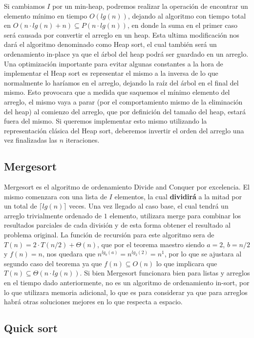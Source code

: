 Si cambiamos $I$ por un min-heap, podremos realizar la operaci\'on de encontrar un elemento m\'inimo en tiempo $O(lg(n))$, dejando al algoritmo con tiempo total en $O(n\cdot lg(n) + n) \subseteq P(n\cdot lg(n))$, en donde la suma en el primer caso ser\'a causada por convertir el arreglo en un heap. Esta ultima modificaci\'on nos dar\'a el algoritmo denominado como Heap sort, el cual tambi\'en ser\'a un ordenamiento in-place ya que el \'arbol del heap podr\'a ser guardado en un arreglo. Una optimizaci\'on importante para evitar algunas constantes a la hora de implementar el Heap sort es representar el mismo a la inversa de lo que normalmente lo har\'iamos en el arreglo, dejando la ra\'iz del \'arbol en el final del mismo. Esto provocara que a medida que saquemos el m\'inimo elemento del arreglo, el mismo vaya a parar (por el comportamiento mismo de la eliminaci\'on del heap) al comienzo del arreglo, que por definici\'on del tama\~no del heap, estar\'a fuera del mismo. Si queremos implementar esto mismo
utilizando la representaci\'on cl\'asica del Heap sort, deberemos invertir el orden del arreglo una vez finalizadas las $n$ iteraciones.

\subsection{Mergesort}

Mergesort es el algoritmo de ordenamiento Divide and Conquer por excelencia. El mismo comenzara con una lista de $I$ elementos, la cual \textbf{dividir\'a} a la mitad por un total de $\lceil lg(n) \rceil$ veces. Una vez llegado al caso base, el cual tendr\'a un arreglo trivialmente ordenado de $1$ elemento, utilizara merge para combinar los resultados parciales de cada divisi\'on y de esta forma obtener el resultado al problema original. La funci\'on de recursi\'on para este algoritmo sera de $T(n) = 2 \cdot T(n/2) + \Theta(n)$, que por el teorema maestro siendo $a=2$, $b=n/2$ y $f(n) = n$, nos quedara que $n^{lg_b(a)} = n^{lg_2(2)} = n^1$, por lo que se ajustara al segundo caso del teorema ya que $f(n) \subseteq O(n)$ lo que implicara que $T(n) \subseteq \Theta(n \cdot lg(n))$. Si bien Mergesort funcionara bien para listas y arreglos en el tiempo dado anteriormente, no es un algoritmo de ordenamiento in-sort, por lo que utilizara memoria adicional, lo que es para considerar ya que para arreglos habr\'a otras
soluciones
mejores en lo que respecta a espacio.

\subsection{Quick sort}

